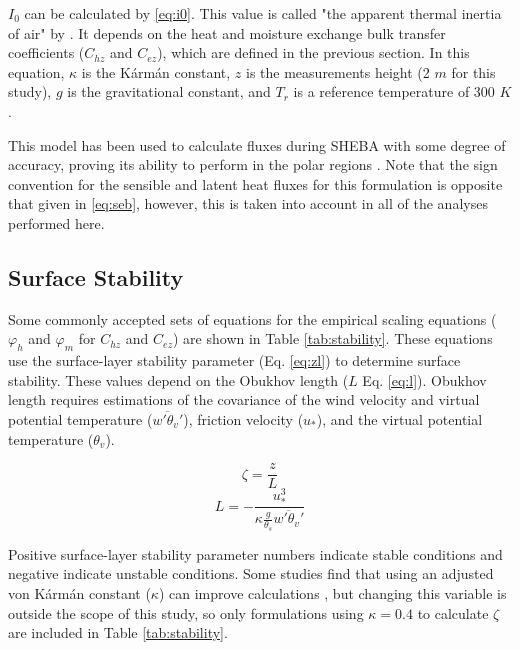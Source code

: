 $I_{0}$ can be calculated by \ref{eq:i0}. This value is called "the apparent thermal inertia of air" by \citet{wang:2009}. It depends on the heat and moisture exchange bulk transfer coefficients ($C_{hz}$ and $C_{ez}$), which are defined in the previous section. In this equation, $\kappa$ is the K\'{a}rm\'{a}n constant, $z$ is the measurements height (2 $m$ for this study), $g$ is the gravitational constant, and $T_{r}$ is a reference temperature of 300 $K$. 

This model has been used to calculate fluxes during SHEBA with some degree of accuracy, proving its ability to perform in the polar regions \citep{wang:2014}. Note that the sign convention for the sensible and latent heat fluxes for this formulation is opposite that given in \ref{eq:seb}, however, this is taken into account in all of the analyses performed here.

\subsection{Surface Stability}
Some commonly accepted sets of equations for the empirical scaling equations ($\varphi_{h}$ and $\varphi_{m}$ for $C_{hz}$ and $C_{ez}$) are shown in Table \ref{tab:stability}. These equations use the surface-layer stability parameter (Eq. \ref{eq:zl}) to determine surface stability. These values depend on the Obukhov length ($L$ Eq. \ref{eq:l}). Obukhov length requires estimations of the covariance of the wind velocity and virtual potential temperature ($\overline{w'\theta_{v}'}$), friction velocity ($u_{*}$), and the virtual potential temperature ($\theta_{v}$). 

\begin{equation}\label{eq:zl}
\zeta = \frac{z}{L}
\end{equation}
\begin{equation}\label{eq:l}
L = -\frac{u_{*}^{3}}{\kappa \frac{g}{\theta_{s}} \overline{w'\theta_{v}'}}
\end{equation} 

Positive surface-layer stability parameter numbers indicate stable conditions and negative indicate unstable conditions. Some studies find that using an adjusted von K\'{a}rm\'{a}n constant ($\kappa$) can improve calculations \citep{businger:1971, zilitinkevitsch:1968, dyer:1970}, but changing this variable is outside the scope of this study, so only formulations using $\kappa = 0.4$ to calculate $\zeta$ are included in Table \ref{tab:stability}. 

